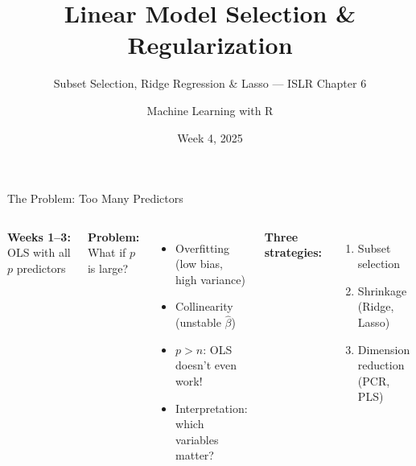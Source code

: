 \documentclass[aspectratio=169, 11pt]{beamer}
\title{Linear Model Selection \& Regularization}
\subtitle{Subset Selection, Ridge Regression \& Lasso --- ISLR Chapter 6}
\author{Machine Learning with R}
\institute{Dr.\ Endri Ra\c{c}o}
\date{Week 4, 2025}
\begin{document}
\begin{frame}\titlepage\end{frame}

\begin{frame}{The Problem: Too Many Predictors}
\begin{columns}
\textbf{Weeks 1--3:} OLS with all $p$ predictors

\textbf{Problem:} What if $p$ is large?
\begin{itemize}
  \item Overfitting (low bias, high variance)
  \item Collinearity (unstable $\hat{\beta}$)
  \item $p > n$: OLS doesn't even work!
  \item Interpretation: which variables matter?
\end{itemize}
\vspace{0.3em}
\textbf{Three strategies:}
\begin{enumerate}
  \item Subset selection
  \item Shrinkage (Ridge, Lasso)
  \item Dimension reduction (PCR, PLS)
\end{enumerate}
\end{columns}
\end{frame}
\end{document}
